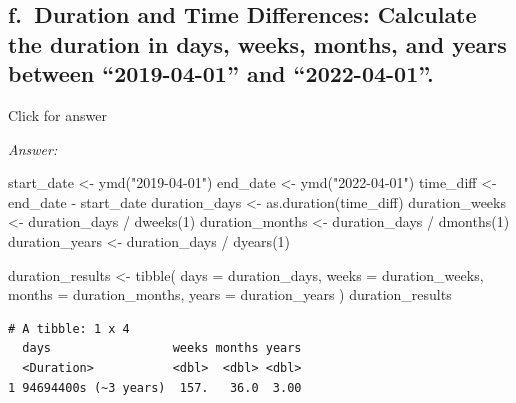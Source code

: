 \documentclass[
]{book}
\newenvironment{Shaded}{\begin{snugshade}}{\end{snugshade}}
\newcommand{\AttributeTok}[1]{\textcolor[rgb]{0.77,0.63,0.00}{#1}}
\newcommand{\DecValTok}[1]{\textcolor[rgb]{0.00,0.00,0.81}{#1}}
\newcommand{\FunctionTok}[1]{\textcolor[rgb]{0.00,0.00,0.00}{#1}}
\newcommand{\NormalTok}[1]{#1}
\newcommand{\OtherTok}[1]{\textcolor[rgb]{0.56,0.35,0.01}{#1}}
\newcommand{\SpecialCharTok}[1]{\textcolor[rgb]{0.00,0.00,0.00}{#1}}
\newcommand{\StringTok}[1]{\textcolor[rgb]{0.31,0.60,0.02}{#1}}
\begin{document}
\hypertarget{f.-duration-and-time-differences-calculate-the-duration-in-days-weeks-months-and-years-between-2019-04-01-and-2022-04-01.}{%
\subsection{f.~Duration and Time Differences: Calculate the duration in days, weeks, months, and years between ``2019-04-01'' and ``2022-04-01''.}\label{f.-duration-and-time-differences-calculate-the-duration-in-days-weeks-months-and-years-between-2019-04-01-and-2022-04-01.}}

Click for answer

\emph{Answer:}

\begin{Shaded}
\begin{Highlighting}[]
\NormalTok{start\_date }\OtherTok{\textless{}{-}} \FunctionTok{ymd}\NormalTok{(}\StringTok{"2019{-}04{-}01"}\NormalTok{)}
\NormalTok{end\_date }\OtherTok{\textless{}{-}} \FunctionTok{ymd}\NormalTok{(}\StringTok{"2022{-}04{-}01"}\NormalTok{)}
\NormalTok{time\_diff }\OtherTok{\textless{}{-}}\NormalTok{ end\_date }\SpecialCharTok{{-}}\NormalTok{ start\_date}
\NormalTok{duration\_days }\OtherTok{\textless{}{-}} \FunctionTok{as.duration}\NormalTok{(time\_diff)}
\NormalTok{duration\_weeks }\OtherTok{\textless{}{-}}\NormalTok{ duration\_days }\SpecialCharTok{/} \FunctionTok{dweeks}\NormalTok{(}\DecValTok{1}\NormalTok{)}
\NormalTok{duration\_months }\OtherTok{\textless{}{-}}\NormalTok{ duration\_days }\SpecialCharTok{/} \FunctionTok{dmonths}\NormalTok{(}\DecValTok{1}\NormalTok{)}
\NormalTok{duration\_years }\OtherTok{\textless{}{-}}\NormalTok{ duration\_days }\SpecialCharTok{/} \FunctionTok{dyears}\NormalTok{(}\DecValTok{1}\NormalTok{)}

\NormalTok{duration\_results }\OtherTok{\textless{}{-}} \FunctionTok{tibble}\NormalTok{(}
  \AttributeTok{days =}\NormalTok{ duration\_days,}
  \AttributeTok{weeks =}\NormalTok{ duration\_weeks,}
  \AttributeTok{months =}\NormalTok{ duration\_months,}
  \AttributeTok{years =}\NormalTok{ duration\_years}
\NormalTok{)}
\NormalTok{duration\_results}
\end{Highlighting}
\end{Shaded}

\begin{verbatim}
# A tibble: 1 x 4
  days                 weeks months years
  <Duration>           <dbl>  <dbl> <dbl>
1 94694400s (~3 years)  157.   36.0  3.00
\end{verbatim}
\end{document}
